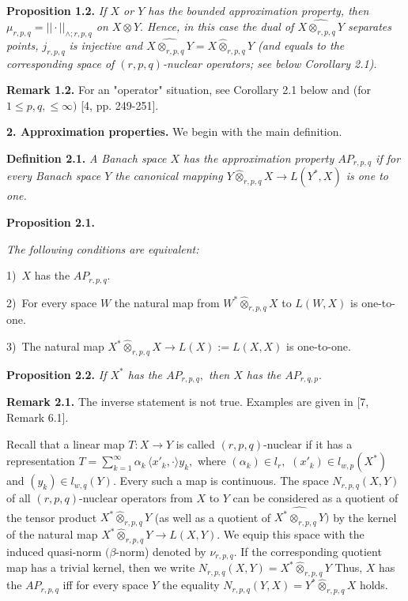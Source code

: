   \textbf{Proposition 1.2.}  {\it
 If $X$ or $Y$ has the bounded approximation property, then
 $\mu_{r,p,q}= ||\cdot||_{\land\!; r,p,q}$ on $X\otimes Y.$ Hence, in this case
 the dual of $\widehat{X\otimes_{r,p,q} Y}$ separates points, $j_{r,p,q}$ is injective and
 $\widehat{X\otimes_{r,p,q} Y}= X\widehat\otimes_{r,p,q} Y$ (and equals to the corresponding space of
 $(r,p,q)$-nuclear operators; see below Corollary 2.1).
 }
                              \smallskip


\textbf{Remark 1.2.}
For an "operator" situation, see Corollary 2.1 below
and (for $1\le p,q,\le \infty)$ [4, pp. 249-251].

          \bigskip


{\bf 2. Approximation properties.}
We begin with the main definition.
\smallskip

\textbf{Definition 2.1.} {\it
 A Banach space $X$ has the approximation property $AP_{r,p,q}$ if
 for every Banach space $Y$ the canonical map\-ping $Y\widehat\otimes_{r,p,q} X\to L(Y^*,X)$
 is one to one.
 }
 \smallskip

\textbf{Proposition 2.1.} {\it
  The following conditions are equivalent:

  1)\,
$X$ has the $AP_{r,p,q}.$

2)\,
For every space $W$
the natural map from $W^*\widehat\otimes_{r,p,q} X$ to $L(W,X)$ is one-to-one.

3)\,
The natural map $X^*\widehat\otimes_{r,p,q} X\to L(X):=L(X,X)$ is one-to-one.
}
        \smallskip


  \textbf{Proposition 2.2.} {\it
 If $X^*$ has the $AP_{r,p,q},$ then $X$ has the $AP_{r,q,p}.$
 }
             \smallskip

       \textbf{Remark 2.1.}
        The inverse statement is not true. Exam\-ples
     are given in [7, Remark 6.1].
             \smallskip


Recall that a linear map $T: X\to Y$ is called $(r,p,q)$-nuclear
if it has a representation $T= \sum_{k=1}^\infty \alpha_k\, \langle  x'_k, \cdot\rangle y_k,$
where $(\alpha_k)\in l_r,$ $(x'_k)\in l_{w,p}(X^*)$ and $(y_k)\in l_{w,q}(Y).$
Every such a map is continuous. The space $N_{r,p,q}(X,Y)$ of all
$(r,p,q)$-nuclear operators from $X$ to $Y$ can be considered as a quotient
of the tensor product $X^*\widehat\otimes_{r,p,q} Y$ (as well as a quotient of
$\widehat{X^*\otimes_{r,p,q} Y})$ by the kernel of the natural map
$X^*\widehat\otimes_{r,p,q} Y \to L(X,Y).$ We equip this space with the induced
quasi-norm $(\beta$-norm)
denoted by $\nu_{r,p,q}.$ If the corresponding quotient map has
a trivial kernel, then we write $N_{r,p,q}(X,Y)= X^*\widehat\otimes_{r,p,q} Y$
Thus, $X$ has the $AP_{r,p,q}$ iff for every space $Y$ the equality
 $N_{r,p,q}(Y,X)= Y^*\widehat\otimes_{r,p,q} X$ holds.
        \smallskip


